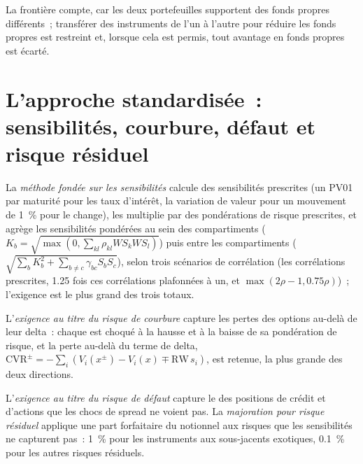 La frontière compte, car les deux portefeuilles supportent des fonds propres différents~; transférer des instruments
de l'un à l'autre pour réduire les fonds propres est restreint et, lorsque cela est permis, tout avantage en fonds propres est
écarté.

\section{L'approche standardisée~: sensibilités, courbure, défaut et risque résiduel}

\begin{definition}\label{def:rc:regulatory-capital-for-trading-books:sbm}
La \emph{méthode fondée sur les sensibilités} calcule des sensibilités prescrites
(un PV01 par maturité pour les taux d'intérêt, la variation de valeur pour un mouvement de 1~\% pour le change),
les multiplie par des pondérations de risque prescrites, et agrège les sensibilités pondérées au sein
des compartiments ($K_b = \sqrt{\max(0,\sum_{kl}\rho_{kl}WS_kWS_l)}$) puis entre les compartiments
($\sqrt{\sum_bK_b^2+\sum_{b\ne c}\gamma_{bc}S_bS_c}$), selon trois scénarios de corrélation (les corrélations prescrites,
1.25 fois ces corrélations plafonnées à un, et $\max(2\rho-1,0.75\rho)$)~; l'exigence est le
plus grand des trois totaux.
\end{definition}

\begin{definition}\label{def:rc:regulatory-capital-for-trading-books:curv}
L'\emph{exigence au titre du risque de courbure} capture les pertes des options
au-delà de leur delta~: chaque  est choqué à la hausse et à la baisse de sa pondération de risque, et la perte
au-delà du terme de delta, $\mathrm{CVR}^\pm = -\sum_i(V_i(x^\pm)-V_i(x)\mp\mathrm{RW}\,s_i)$, est retenue, la plus
grande des deux directions.
\end{definition}

\begin{definition}\label{def:rc:regulatory-capital-for-trading-books:drc}
L'\emph{exigence au titre du risque de défaut} capture le  des
positions de crédit et d'actions que les chocs de spread ne voient pas. La \emph{majoration pour risque
résiduel} applique une part forfaitaire du notionnel aux risques que les
sensibilités ne capturent pas~: 1~\% pour les instruments aux sous-jacents exotiques, 0.1~\% pour les autres
risques résiduels.
\end{definition}

